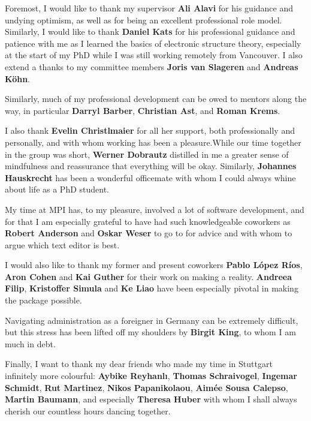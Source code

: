 
Foremost, I would like to thank my supervisor \textbf{Ali Alavi} for his guidance and undying optimism, as well as for being an excellent professional role model. Similarly, I would like to thank \textbf{Daniel Kats} for his professional guidance and patience with me as I learned the basics of electronic structure theory, especially at the start of my PhD while I was still working remotely from Vancouver. I also extend a thanks to my committee members \textbf{Joris van Slageren} and \textbf{Andreas K\"ohn}.

Similarly, much of my professional development can be owed to mentors along the way, in particular \textbf{Darryl Barber}, \textbf{Christian Ast}, and \textbf{Roman Krems}.

I also thank \textbf{Evelin Christlmaier} for all her support, both professionally and personally, and with whom working has been a pleasure.While our time together in the group was short, \textbf{Werner Dobrautz} distilled in me a greater sense of mindfulness and reassurance that everything will be okay. Similarly, \textbf{Johannes Hauskrecht} has been a wonderful officemate with whom I could always whine about life as a PhD student.

My time at MPI has, to my pleasure, involved a lot of software development, and for that I am especially grateful to have had such knowledgeable coworkers as \textbf{Robert Anderson} and \textbf{Oskar Weser} to go to for advice and with whom to argue which text editor is best.

I would also like to thank my former and present coworkers \textbf{Pablo L\'opez R\'ios}, \textbf{Aron Cohen} and \textbf{Kai Guther} for their work on making \tchint a reality. \textbf{Andreea Filip}, \textbf{Kristoffer Simula} and \textbf{Ke Liao} have been especially pivotal in making the \pytchint package possible.

Navigating administration as a foreigner in Germany can be extremely difficult, but this stress has been lifted off my shoulders by \textbf{Birgit King}, to whom I am much in debt.


Finally, I want to thank my dear friends who made my time in Stuttgart infinitely more colourful: \textbf{Aybike Reyhanl\i}, \textbf{Thomas Schraivogel}, \textbf{Ingemar Schmidt}, \textbf{Rut Martinez}, \textbf{Nikos Papanikolaou}, \textbf{Aim\'ee Sousa Calepso}, \textbf{Martin Baumann}, and especially \textbf{Theresa Huber} with whom I shall always cherish our countless hours dancing together.
